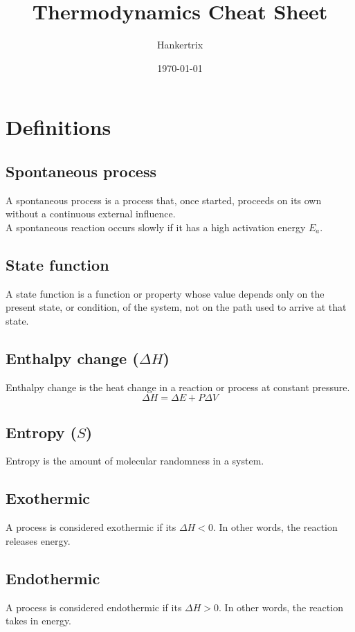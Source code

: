 \documentclass[11pt]{article}
\author{Hankertrix}
\date{\today}
\title{Thermodynamics Cheat Sheet}
\begin{document}
\maketitle
\setcounter{tocdepth}{2}
\tableofcontents

\newpage

\section{Definitions}
\label{sec:org2188e5e}

\subsection{Spontaneous process}
\label{sec:org2660308}
A spontaneous process is a process that, once started, proceeds on its own without a continuous external influence.
\\[0pt]

A spontaneous reaction occurs slowly if it has a high activation energy \(E_a\).

\subsection{State function}
\label{sec:org43b0d44}
A state function is a function or property whose value depends only on the present state, or condition, of the system, not on the path used to arrive at that state.

\subsection{Enthalpy change (\(\Delta H\))}
\label{sec:orgbd19024}
Enthalpy change is the heat change in a reaction or process at constant pressure.
\[\Delta H = \Delta E + P \Delta V\]

\subsection{Entropy (\(S\))}
\label{sec:org001a314}
Entropy is the amount of molecular randomness in a system.

\subsection{Exothermic}
\label{sec:orgf12b3af}
A process is considered exothermic if its \(\Delta H < 0\). In other words, the reaction releases energy.

\subsection{Endothermic}
\label{sec:orga240e4a}
A process is considered endothermic if its \(\Delta H > 0\). In other words, the reaction takes in energy.
\end{document}
